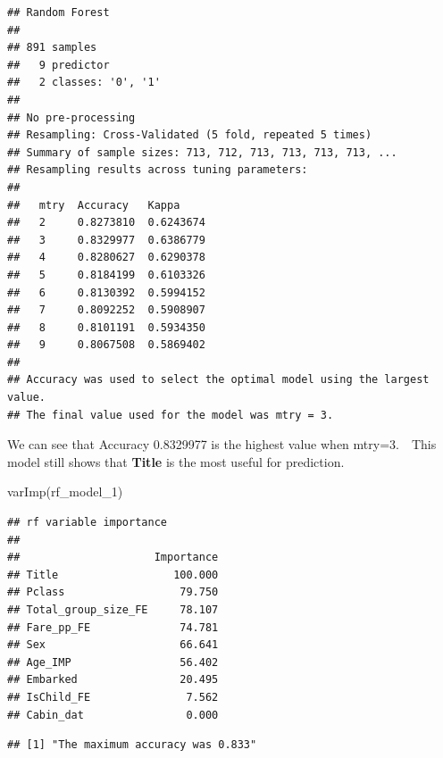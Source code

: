 \documentclass[
]{article}
\newenvironment{Shaded}{\begin{snugshade}}{\end{snugshade}}
\newcommand{\DecValTok}[1]{\textcolor[rgb]{0.00,0.00,0.81}{#1}}
\newcommand{\FunctionTok}[1]{\textcolor[rgb]{0.00,0.00,0.00}{#1}}
\newcommand{\NormalTok}[1]{#1}
\newcommand{\SpecialCharTok}[1]{\textcolor[rgb]{0.00,0.00,0.00}{#1}}
\newcommand{\StringTok}[1]{\textcolor[rgb]{0.31,0.60,0.02}{#1}}
\begin{document}
\begin{verbatim}
## Random Forest 
## 
## 891 samples
##   9 predictor
##   2 classes: '0', '1' 
## 
## No pre-processing
## Resampling: Cross-Validated (5 fold, repeated 5 times) 
## Summary of sample sizes: 713, 712, 713, 713, 713, 713, ... 
## Resampling results across tuning parameters:
## 
##   mtry  Accuracy   Kappa    
##   2     0.8273810  0.6243674
##   3     0.8329977  0.6386779
##   4     0.8280627  0.6290378
##   5     0.8184199  0.6103326
##   6     0.8130392  0.5994152
##   7     0.8092252  0.5908907
##   8     0.8101191  0.5934350
##   9     0.8067508  0.5869402
## 
## Accuracy was used to select the optimal model using the largest value.
## The final value used for the model was mtry = 3.
\end{verbatim}

We can see that Accuracy 0.8329977 is the highest value when
mtry=3.　This model still shows that \textbf{Title} is the most useful
for prediction.

\begin{Shaded}
\begin{Highlighting}[]
\FunctionTok{varImp}\NormalTok{(rf\_model\_1)}
\end{Highlighting}
\end{Shaded}

\begin{verbatim}
## rf variable importance
## 
##                     Importance
## Title                  100.000
## Pclass                  79.750
## Total_group_size_FE     78.107
## Fare_pp_FE              74.781
## Sex                     66.641
## Age_IMP                 56.402
## Embarked                20.495
## IsChild_FE               7.562
## Cabin_dat                0.000
\end{verbatim}

\begin{Shaded}
\end{Shaded}

\begin{verbatim}
## [1] "The maximum accuracy was 0.833"
\end{verbatim}
\end{document}
